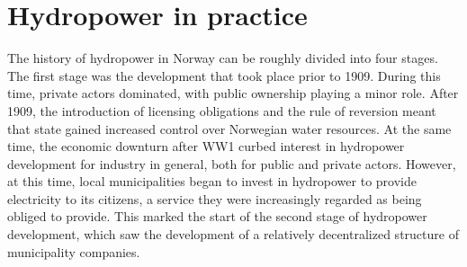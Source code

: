 %
%
%
%
%
%

\section{Hydropower in practice}

The history of hydropower in Norway can be roughly divided into four stages. The first stage was the development that took place prior to 1909. During this time, private actors dominated, with public ownership playing a minor role. After 1909, the introduction of licensing obligations and the rule of reversion meant that state gained increased control over Norwegian water resources. At the same time, the economic downturn after WW1 curbed interest in hydropower development for industry in general, both for public and private actors. However, at this time, local municipalities began to invest in hydropower to provide electricity to its citizens, a service they were increasingly regarded as being obliged to provide. This marked the start of the second stage of hydropower development, which saw the development of a relatively decentralized structure of municipality companies. 

